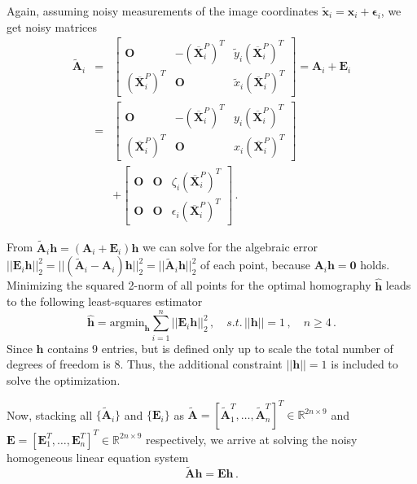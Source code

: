 \documentclass[letterpaper, 10 pt, conference]{ieeeconf}  %
\begin{document}
	Again, assuming noisy measurements of the image coordinates
	$\tilde{\mathbf{x}}_i = \mathbf{x}_i + \bm{\epsilon}_i$, we get noisy matrices
	\begin{eqnarray}
	\tilde{\mathbf{A}}_i & = &
	\begin{bmatrix}
	\mathbf{O} & -(\overline{\mathbf{X}}_i^P)^T & \tilde{y}_i(\overline{\mathbf{X}}_i^P)^T \\
	(\overline{\mathbf{X}}_i^P)^T & \mathbf{O} & \tilde{x}_i(\overline{\mathbf{X}}_i^P)^T 
	\end{bmatrix} = 
	\mathbf{A}_i + \mathbf{E}_i \\
	& = &
	\begin{bmatrix}
	\mathbf{O} & -(\overline{\mathbf{X}}_i^P)^T & y_i(\overline{\mathbf{X}}_i^P)^T \\
	(\overline{\mathbf{X}}_i^P)^T & \mathbf{O} & x_i(\overline{\mathbf{X}}_i^P)^T 
	\end{bmatrix} \\
	& & +
	\begin{bmatrix}
	\mathbf{O} & \mathbf{O} & \zeta_i(\overline{\mathbf{X}}_i^P)^T \\
	\mathbf{O} & \mathbf{O} & \epsilon_i(\overline{\mathbf{X}}_i^P)^T 
	\end{bmatrix}\,.
	\end{eqnarray}
	
	From $\tilde{\mathbf{A}}_i\mathbf{h} = (\mathbf{A}_i + \mathbf{E}_i)\mathbf{h}$
	we can solve for the algebraic error
	$|\!|\mathbf{E}_i\mathbf{h}|\!|_2^2 = |\!|(\tilde{\mathbf{A}}_i-\mathbf{A}_i)\mathbf{h} |\!|_2^2= |\!|\tilde{\mathbf{A}}_i\mathbf{h}|\!|_2^2$ of each point, because $\mathbf{A}_i\mathbf{h} = \mathbf{0}$ holds.
	Minimizing the squared 2-norm of all points for the optimal homography $\hat{\mathbf{h}}$ 
	leads to the following least-squares estimator
	\begin{equation}
	\label{Eq5}
	\hat{\mathbf{h}} = \text{argmin}_{\mathbf{h}} 
	\sum\limits_{i=1}^n |\!|\mathbf{E}_i\mathbf{h}|\!|_2^2\, , \quad s.t. \, |\!|\mathbf{h}|\!|=1\,,\quad n \geq 4 \,.
	\end{equation} 
	Since $\mathbf{h}$ contains 9 entries, but is defined only up to scale the total number of degrees of freedom is 8. Thus, the additional constraint $|\!|\mathbf{h}|\!|=1$ is included to solve the optimization.
	
	Now, stacking all $\{\tilde{\mathbf{A}}_i\}$ and $\{\mathbf{E}_i\}$ as $\tilde{\mathbf{A}}=[\tilde{\mathbf{A}}_1^T, \dots, \tilde{\mathbf{A}}_n^T]^T \in \mathbb{R}^{2n \times 9}$
	and $\mathbf{E}=[\mathbf{E}_1^T, \dots, \mathbf{E}_n^T]^T \in \mathbb{R}^{2n \times 9}$ respectively, we arrive at solving
	the noisy homogeneous linear equation system
	\begin{equation}
	\label{Eq6}
	\tilde{\mathbf{A}}\mathbf{h}=\mathbf{E}\mathbf{h} \,.
	\end{equation}
	
\end{document}
